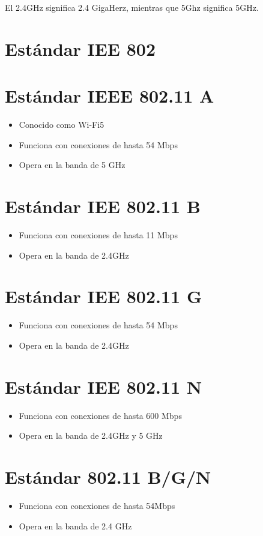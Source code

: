 \documentclass[letterpaper,12pt]{article}
\begin{document}
\begin{sloppypar}
El 2.4GHz significa 2.4 GigaHerz, mientras que 5Ghz significa 5GHz.
\section*{Estándar IEE 802}
\section{Estándar IEEE 802.11 A}
\begin{itemize}
    \item Conocido como Wi-Fi5
    \item Funciona con conexiones de hasta 54 Mbps 
    \item Opera en la banda de 5 GHz
\end{itemize}
\section{Estándar IEE 802.11 B}
\begin{itemize}
    \item Funciona con conexiones de hasta 11 Mbps
    \item Opera en la banda de 2.4GHz
\end{itemize}
\section{Estándar IEE 802.11 G}
\begin{itemize}
    \item Funciona con conexiones de hasta 54 Mbps 
    \item Opera en la banda de 2.4GHz
\end{itemize}
\section{Estándar IEE 802.11 N}
\begin{itemize}
    \item Funciona con conexiones de hasta 600 Mbps 
    \item Opera en la banda de 2.4GHz y 5 GHz
\end{itemize}
\section{Estándar 802.11 B/G/N}
\begin{itemize}
    \item Funciona con conexiones de hasta 54Mbps 
    \item Opera en la banda de 2.4 GHz
\end{itemize}

\end{sloppypar}
\end{document}
